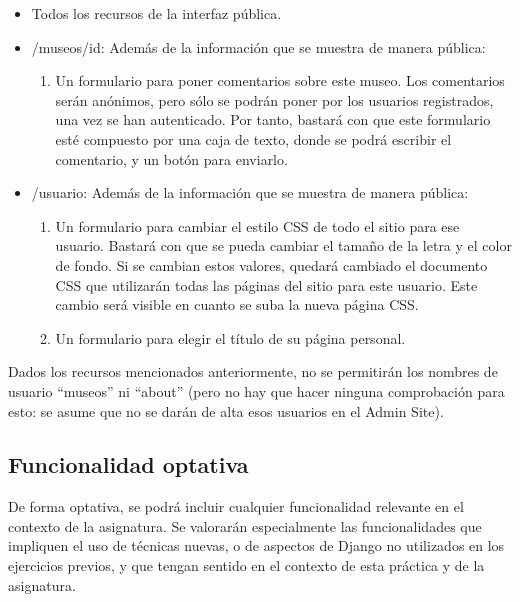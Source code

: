 \begin{itemize}
  \item Todos los recursos de la interfaz pública.
  
  \item /museos/{id}: Además de la información que se muestra de manera pública:

    \begin{enumerate}
      \item Un formulario para poner comentarios sobre este museo. Los comentarios serán anónimos, pero sólo se podrán poner por los usuarios registrados, una vez se han autenticado. Por tanto, bastará con que este formulario esté compuesto por una caja de texto, donde se podrá escribir el comentario, y un botón para enviarlo.
  \end{enumerate}

  \item /{usuario}: Además de la información que se muestra de manera pública:
  
  \begin{enumerate}
    \item Un formulario para cambiar el estilo CSS de todo el sitio para ese usuario. Bastará con que se pueda cambiar el tamaño de la letra y el color de fondo. Si se cambian estos valores, quedará cambiado el documento CSS que utilizarán todas las páginas del sitio para este usuario. Este cambio será visible en cuanto se suba la nueva página CSS.

    \item Un formulario para elegir el título de su página personal.
  \end{enumerate}
\end{itemize}


Dados los recursos mencionados anteriormente, no se permitirán los nombres de usuario ``museos'' ni ``about'' (pero no hay que hacer ninguna comprobación para esto: se asume que no se darán de alta esos usuarios en el Admin Site).


\subsection{Funcionalidad optativa}

De forma optativa, se podrá incluir cualquier funcionalidad relevante en el contexto de la asignatura. Se valorarán especialmente las funcionalidades que impliquen el uso de técnicas nuevas, o de aspectos de Django no utilizados en los ejercicios previos, y que tengan sentido en el contexto de esta práctica y de la asignatura.

